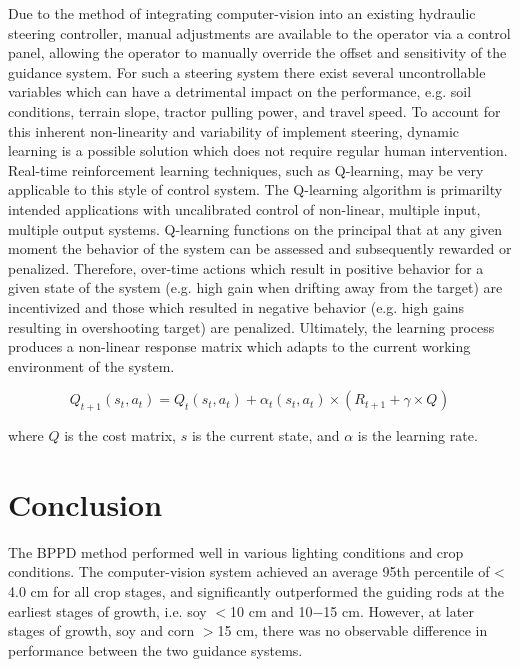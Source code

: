 \documentclass[authoryear]{elsarticle}
\begin{document}
Due to the method of integrating computer-vision into an existing
hydraulic steering controller, manual adjustments are available to the
operator via a control panel, allowing the operator to manually override the
offset and sensitivity of the guidance system. For such a
steering system there exist several uncontrollable variables which can
have a detrimental impact on the performance, e.g. soil conditions,
terrain slope, tractor pulling power, and travel speed. To account for
this inherent non-linearity and variability of implement steering,
dynamic learning is a possible solution which does not require regular human
intervention. Real-time reinforcement learning techniques, such as
Q-learning, may be very applicable to this style of control
system. The Q-learning algorithm is primarilty intended applications
with uncalibrated control of non-linear, multiple input, multiple output systems. 
Q-learning functions on the principal that at any given
moment the behavior of the system can be assessed and subsequently
rewarded or penalized. Therefore, over-time actions which result
in positive behavior for a given state of the system (e.g. high gain
when drifting away from the target) are incentivized and those which
resulted in negative behavior (e.g. high gains resulting in
overshooting target) are penalized. Ultimately, the learning process
produces a non-linear response matrix which adapts to the current
working environment of the system.

\begin{equation}
  Q_{t+1}(s_t,a_t) = Q_{t}(s_t,a_t) + \alpha_{t}(s_t,a_t) \times
  \left( R_{t+1} + \gamma \times Q_{} \right)
  \label{eq:qlearning}
\end{equation}
\begin{flushleft}
where $Q$ is the cost matrix, $s$ is the current state, and $\alpha$
is the learning rate. 
\end{flushleft}

\section{Conclusion}
The BPPD method performed well in various lighting conditions and crop conditions.
The computer-vision system achieved an average 95th percentile of <
4.0 cm for all crop stages, and significantly outperformed the guiding
rods at the earliest stages of growth, i.e. soy $<$10 cm and 10$-$15 cm. However, at
later stages of growth, soy and corn $>$15 cm, there was no observable difference in
performance between the two guidance systems. 
\end{document}
